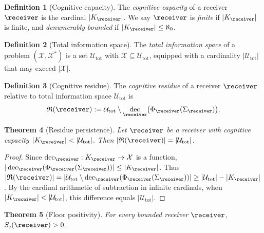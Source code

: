 \documentclass[11pt,a4paper]{article}
\theoremstyle{thmstyle}
\newtheorem{theorem}{Theorem}[section]
\theoremstyle{thmstyle}
\theoremstyle{definition}
\newtheorem{definition}[theorem]{Definition}
\theoremstyle{remark}
\DeclareMathOperator{\dec}{dec}
\newcommand{\Cands}{\mathcal{X}}
\newcommand{\Truth}{\mathcal{X}^{*}}
\newcommand{\Sub}{\mathcal{U}}
\newcommand{\Resi}{\mathfrak{R}}
\newcommand{\Sfloor}{S_{\flat}}
\begin{document}
\begin{definition}[Cognitive capacity]\label{def:cog-cap}
The \emph{cognitive capacity} of a receiver $\receiver$
is the cardinal $|K_{\receiver}|$.  We say $\receiver$ is
\emph{finite} if $|K_{\receiver}|$ is finite, and
\emph{denumerably bounded} if $|K_{\receiver}| \leq \aleph_{0}$.
\end{definition}

\begin{definition}[Total information space]\label{def:total-info}
The \emph{total information space} of a problem
$(\Cands, \Truth)$ is a set $\Sub_{\mathrm{tot}}$ with
$\Cands \subseteq \Sub_{\mathrm{tot}}$, equipped with a
cardinality $|\Sub_{\mathrm{tot}}|$ that may exceed
$|\Cands|$.
\end{definition}

\begin{definition}[Cognitive residue]\label{def:residue}
The \emph{cognitive residue} of a receiver $\receiver$
relative to total information space $\Sub_{\mathrm{tot}}$ is
\[
\Resi(\receiver) := \Sub_{\mathrm{tot}} \setminus
   \dec_{\receiver}\bigl(\Phi_{\receiver}(\Sigma_{\receiver})\bigr).
\]
\end{definition}

\begin{theorem}[Residue persistence]\label{thm:residue-persistence}
Let $\receiver$ be a receiver with cognitive capacity
$|K_{\receiver}| < |\Sub_{\mathrm{tot}}|$.  Then
$|\Resi(\receiver)| = |\Sub_{\mathrm{tot}}|$.
\end{theorem}

\begin{proof}
Since $\dec_{\receiver}: K_{\receiver} \to \Cands$ is a
function, $|\dec_{\receiver}(\Phi_{\receiver}(\Sigma_{\receiver}))|
\leq |K_{\receiver}|$.  Thus
$|\Resi(\receiver)| = |\Sub_{\mathrm{tot}} \setminus
\dec_{\receiver}(\Phi_{\receiver}(\Sigma_{\receiver}))|
\geq |\Sub_{\mathrm{tot}}| - |K_{\receiver}|$.
By the cardinal arithmetic of subtraction in infinite
cardinals, when $|K_{\receiver}| < |\Sub_{\mathrm{tot}}|$,
this difference equals $|\Sub_{\mathrm{tot}}|$.
\end{proof}

\begin{theorem}[Floor positivity]\label{thm:floor-positivity}
\label{sec:floor-theorem}
For every bounded receiver $\receiver$,
$\Sfloor(\receiver) > 0$.
\end{theorem}
\end{document}

